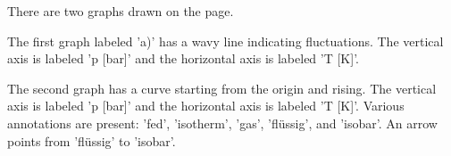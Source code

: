 There are two graphs drawn on the page.

The first graph labeled 'a)' has a wavy line indicating fluctuations. The vertical axis is labeled 'p [bar]' and the horizontal axis is labeled 'T [K]'.

The second graph has a curve starting from the origin and rising. The vertical axis is labeled 'p [bar]' and the horizontal axis is labeled 'T [K]'. Various annotations are present: 'fed', 'isotherm', 'gas', 'flüssig', and 'isobar'. An arrow points from 'flüssig' to 'isobar'.